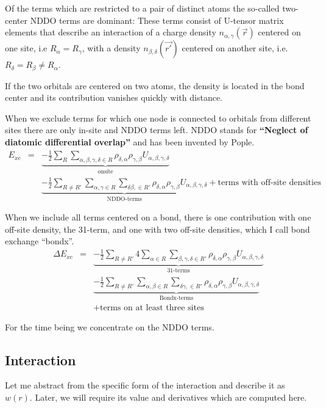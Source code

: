 \documentclass[11pt,a4paper]{report}
\begin{document}
Of the terms which are restricted to a pair of distinct atoms the
so-called two-center NDDO terms are dominant: These terms consist of
U-tensor matrix elements that describe an interaction of a charge
density $n_{\alpha,\gamma}(\vec{r})$ centered on one site, i.e
$R_\alpha=R_\gamma$, with a density $n_{\beta,\delta}(\vec{r'})$
centered on another site, i.e. $R_\delta=R_\beta\neq R_\alpha$.

If the two orbitals are centered on two atoms, the density is located
in the bond center and its contribution vanishes quickly with
distance.

When we exclude terms for which one node is connected to orbitals from
different sites there are only in-site and NDDO terms left. NDDO
stands for \textbf{``Neglect of diatomic differential overlap''} and
has been invented by Pople.
\begin{eqnarray}
E_{xc}&=&
\underbrace{
-\frac{1}{2}
\sum_R\sum_{\alpha,\beta,\gamma,\delta\in R}
\rho_{\delta,\alpha}\rho_{\gamma,\beta}U_{\alpha,\beta,\gamma,\delta}
}_{\text{onsite}}
\nonumber\\
&&
\underbrace{
-\frac{1}{2}
\sum_{R\neq R'}
\sum_{\alpha,\gamma\in R}\sum_{\delta\beta,\in R'}
\rho_{\delta,\alpha}\rho_{\gamma,\beta}U_{\alpha,\beta,\gamma,\delta}
}_{\text{NDDO-terms}}
+\text{terms with off-site densities}
\end{eqnarray}

When we include all terms centered on a bond, there is one contribution
with one off-site density, the 31-term, and one with two off-site
densities, which I call bond exchange ``bondx''.
\begin{eqnarray}
\Delta E_{xc}
&=&
\underbrace{
-\frac{1}{2}
\sum_{R\neq R'}
4\sum_{\alpha\in R}\sum_{\beta,\gamma,\delta\in R'}
\rho_{\delta,\alpha}\rho_{\gamma,\beta}U_{\alpha,\beta,\gamma,\delta}
}_{\text{31-terms}}
\nonumber\\
&&
\underbrace{
-\frac{1}{2}
\sum_{R\neq R'}
\sum_{\alpha,\beta\in R}\sum_{\delta\gamma,\in R'}
\rho_{\delta,\alpha}\rho_{\gamma,\beta}U_{\alpha,\beta,\gamma,\delta}
}_{\text{Bondx-terms}}
\nonumber\\
&&+\text{terms on at least three sites}
\end{eqnarray}

For the time being we concentrate on the NDDO terms.

\subsection{Interaction}
Let me abstract from the specific form of the interaction and describe
it as $w(r)$. Later, we will require its value and derivatives which
are computed here.
\end{document}

